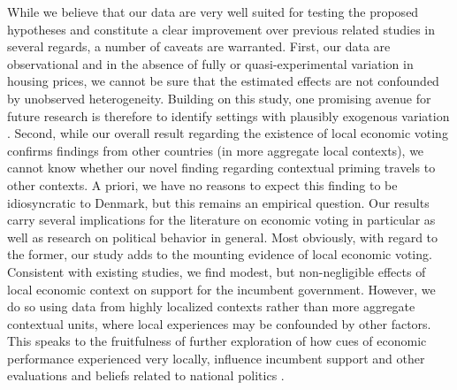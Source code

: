 \documentclass[12pt,a4paper]{article}
\begin{document}
	While we believe that our data are very well suited for testing the proposed hypotheses and constitute a clear improvement over previous related studies in several regards, a number of caveats are warranted. First, our data are observational and in the absence of fully or quasi-experimental variation in housing prices, we cannot be sure that the estimated effects are not confounded by unobserved heterogeneity. Building on this study, one promising avenue for future research is therefore to identify settings with plausibly exogenous variation \citep{jerzak2016property}. Second, while our overall result regarding the existence of local economic voting confirms findings from other countries (in more aggregate local contexts), we cannot know whether our novel finding regarding contextual priming travels to other contexts. A priori, we have no reasons to expect this finding to be idiosyncratic to Denmark, but this remains an empirical question. 
	Our results carry several implications for the literature on economic voting in particular as well as research on political behavior in general. Most obviously, with regard to the former, our study adds to the mounting evidence of local economic voting. Consistent with existing studies, we find modest, but non-negligible effects \cite{healy2013retrospective} of local economic context on support for the incumbent government. However, we do so using data from highly localized contexts rather than more aggregate contextual units, where local experiences may be confounded by other factors. This speaks to the fruitfulness of further exploration of how cues of economic performance experienced very locally, influence incumbent support and other evaluations and beliefs related to national politics \citep[e.g.,][]{burnett2017politics}.
	
\end{document}
